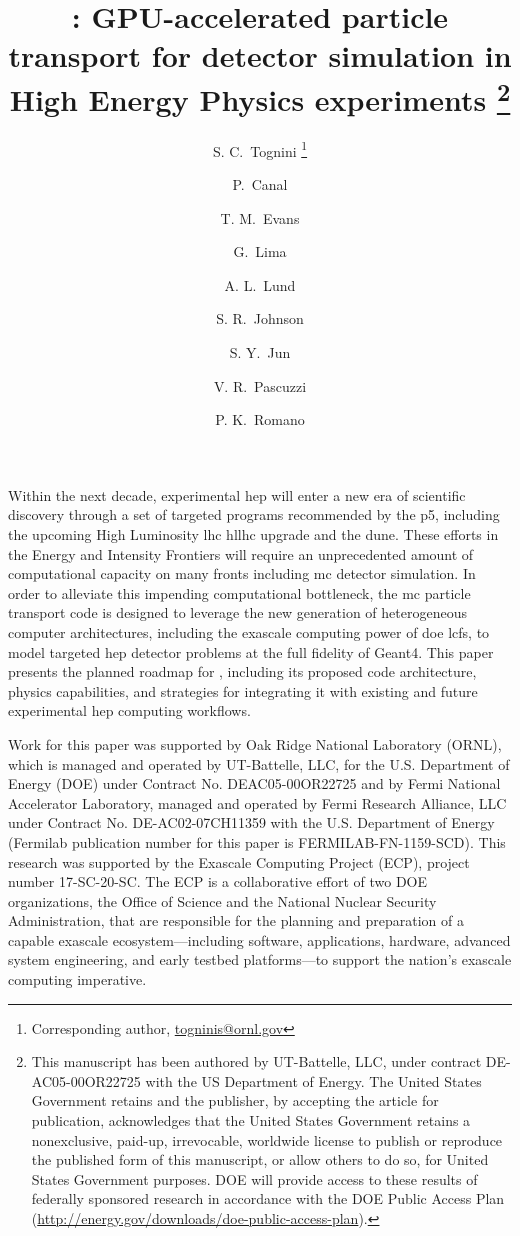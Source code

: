 \documentclass[11pt]{article}
\title
{%
 \celeritas: GPU-accelerated particle transport for detector simulation in High
 Energy Physics experiments \footnote{This manuscript has been authored by
 UT-Battelle, LLC, under contract DE-AC05-00OR22725 with the US Department of
 Energy. The United States Government retains and the publisher, by accepting
 the article for publication, acknowledges that the United States Government
 retains a nonexclusive, paid-up, irrevocable, worldwide license to publish or
 reproduce the published form of this manuscript, or allow others to do so, for
 United States Government purposes. DOE will provide access to these results of
 federally sponsored research in accordance with the DOE Public Access Plan
  (\url{http://energy.gov/downloads/doe-public-access-plan}).}%
}
\date{}
\author[1]{S. C.~Tognini%
  \footnote{Corresponding author,
  \href{mailto:togninis@ornl.gov}{togninis@ornl.gov}}
}
\author[2]{P.~Canal}
\author[1]{T. M.~Evans}
\author[2]{G.~Lima}
\author[3]{A. L.~Lund}
\author[1]{S. R.~Johnson}
\author[2]{S. Y.~Jun}
\author[4]{V. R.~Pascuzzi}
\author[3]{P. K.~Romano}
\affil[1]{Oak Ridge National Laboratory, Oak Ridge, TN 37831, USA}
\affil[2]{Fermi National Accelerator Laboratory, Batavia, IL 60510, USA}
\affil[3]{Argonne National Laboratory, Lemont, IL 60439, USA}
\affil[4]{Brookhaven National Laboratory, Upton, NY 11973, USA}
\begin{document}
\maketitle

\begin{Abstract}
Within the next decade, experimental \ac{hep} will enter a new era of scientific
discovery through a set of targeted programs recommended by the \ac{p5},
including the upcoming High Luminosity \ac{lhc} \acs{hllhc} upgrade and the
\ac{dune}. These efforts in the Energy and Intensity Frontiers will require an
unprecedented amount of computational capacity on many fronts including \ac{mc}
detector simulation. In order to alleviate this impending computational
bottleneck, the \celeritas \ac{mc}  particle transport code is designed to
leverage the new generation of heterogeneous computer architectures, including
the exascale computing power of \ac{doe} \acp{lcf}, to model targeted \ac{hep}
detector problems at the full fidelity of Geant4. This paper presents the
planned roadmap for \celeritas, including its proposed code architecture,
physics capabilities, and strategies for integrating it with existing and future
experimental \ac{hep} computing workflows.
\end{Abstract}

\snowmass







\Acknowledgements Work for this paper was supported by Oak Ridge National
Laboratory (ORNL), which is managed and operated by UT-Battelle, LLC, for the
U.S. Department of Energy (DOE) under Contract No. DEAC05-00OR22725 and by Fermi
National Accelerator Laboratory, managed and operated by Fermi Research
Alliance, LLC under Contract No. DE-AC02-07CH11359 with the U.S. Department of
Energy (Fermilab publication number for this paper is FERMILAB-FN-1159-SCD).
This research was supported by the Exascale Computing Project (ECP), project
number 17-SC-20-SC. The ECP is a collaborative effort of two DOE organizations,
the Office of Science and the National Nuclear Security Administration, that are
responsible for the planning and preparation of a capable exascale
ecosystem---including software, applications, hardware, advanced system
engineering, and early testbed platforms---to support the nation's exascale
computing imperative.

\printbibliography

\end{document}
